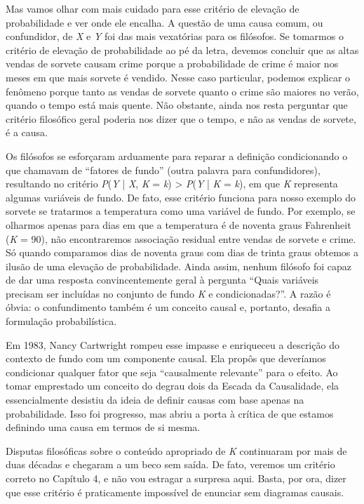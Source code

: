 \documentclass[11pt,a5paper,twoside]{book}
\begin{document}
Mas vamos olhar com mais cuidado para esse critério de elevação de probabilidade e ver onde ele encalha. A questão de uma causa comum, ou confundidor, de \textit{X} e \textit{Y} foi das mais vexatórias para os filósofos. Se tomarmos o critério de elevação de probabilidade ao pé da letra, devemos concluir que as altas vendas de sorvete causam crime porque a probabilidade de crime é maior nos meses em que mais sorvete é vendido. Nesse caso particular, podemos explicar o fenômeno porque tanto as vendas de sorvete quanto o crime são maiores no verão, quando o tempo está mais quente. Não obstante, ainda nos resta perguntar que critério filosófico geral poderia nos dizer que o tempo, e não as vendas de sorvete, é a causa.

Os filósofos se esforçaram arduamente para reparar a definição condicionando o que chamavam de “fatores de fundo” (outra palavra para confundidores), resultando no critério \textit{P}(\textit{Y} | \textit{X}, \textit{K} = \textit{k}) > \textit{P}(\textit{Y} | \textit{K} = \textit{k}), em que \textit{K} representa algumas variáveis de fundo. De fato, esse critério funciona para nosso exemplo do sorvete se tratarmos a temperatura como uma variável de fundo. Por exemplo, se olharmos apenas para dias em que a temperatura é de noventa graus Fahrenheit (\textit{K} = 90), não encontraremos associação residual entre vendas de sorvete e crime. Só quando comparamos dias de noventa graus com dias de trinta graus obtemos a ilusão de uma elevação de probabilidade. Ainda assim, nenhum filósofo foi capaz de dar uma resposta convincentemente geral à pergunta “Quais variáveis precisam ser incluídas no conjunto de fundo \textit{K} e condicionadas?”. A razão é óbvia: o confundimento também é um conceito causal e, portanto, desafia a formulação probabilística.

Em 1983, Nancy Cartwright rompeu esse impasse e enriqueceu a descrição do contexto de fundo com um componente causal. Ela propôs que deveríamos condicionar qualquer fator que seja “causalmente relevante” para o efeito. Ao tomar emprestado um conceito do degrau dois da Escada da Causalidade, ela essencialmente desistiu da ideia de definir causas com base apenas na probabilidade. Isso foi progresso, mas abriu a porta à crítica de que estamos definindo uma causa em termos de si mesma.

Disputas filosóficas sobre o conteúdo apropriado de \textit{K} continuaram por mais de duas décadas e chegaram a um beco sem saída. De fato, veremos um critério correto no Capítulo 4, e não vou estragar a surpresa aqui. Basta, por ora, dizer que esse critério é praticamente impossível de enunciar sem diagramas causais.
\end{document}

